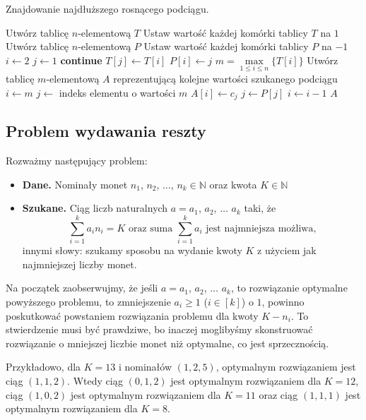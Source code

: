 \begin{algorithm}[H]
	\caption{Znajdowanie najdłuższego rosnącego podciągu.}\label{MaxIncreasingSubseqence}
	\begin{algorithmic}[1]
		\State Utwórz tablicę $n$-elementową $T$
		\State Ustaw wartość każdej komórki tablicy $T$ na $1$
		\State Utwórz tablicę $n$-elementową $P$
		\State Ustaw wartość każdej komórki tablicy $P$ na $-1$
		\State $i \gets 2$
		\State $j \gets 1$
		\textbf{continue}
		\EndIf
		\State $T[j] \gets T[i]$
		\State $P[i] \gets j$
		\EndIf
		\EndWhile
		\EndWhile
		\State $m = \max\limits_{1 \leq i \leq n}\{T[i]\}$ 
		\State Utwórz tablicę $m$-elementową $A$ reprezentującą
		kolejne wartości szukanego podciągu
		\State $i \gets m$
		\State $j \gets$ indeks elementu o wartości $m$
		\State $A[i] \gets c_j$
		\State $j \gets P[j]$
		\State $i \gets i - 1$
		\EndWhile
		\State \Return $A$
		\EndProcedure
	\end{algorithmic}
\end{algorithm}

\subsection{Problem wydawania reszty}
Rozważmy następujący problem:
\begin{itemize}
	\item[] \textbf{Dane.} Nominały monet $n_1$, $n_2$, 
	$\ldots$, $n_k \in \mathbb{N}$ oraz kwota $K \in \mathbb{N}$
	\item[] \textbf{Szukane.} Ciąg liczb naturalnych $a = a_1$, $a_2$,
	$\ldots$ $a_k$ taki, że 
	\[\sum\limits_{i=1}^{k} a_in_i = K \text{ oraz suma } 
	\sum\limits_{i=1}^{k} a_i
	\text{ jest najmniejsza możliwa,}\]
	innymi słowy: szukamy sposobu na wydanie kwoty $K$ z użyciem
	jak najmniejszej liczby monet.
\end{itemize}

Na początek zaobserwujmy, że jeśli $a = a_1$, $a_2$,
$\ldots$ $a_k$, to rozwiązanie optymalne powyższego problemu, to 
zmniejszenie $a_i \geq 1$ ($i \in [k]$) o $1$, powinno 
poskutkować powstaniem rozwiązania problemu dla kwoty $K - n_i$.
To stwierdzenie musi być prawdziwe, bo inaczej moglibyśmy
skonstruować rozwiązanie o mniejszej liczbie monet
niż optymalne, co jest sprzecznością.

Przykładowo, dla $K = 13$ i nominałów $(1, 2, 5)$, optymalnym
rozwiązaniem jest ciąg $(1, 1, 2)$. Wtedy ciąg $(0, 1, 2)$
jest optymalnym rozwiązaniem dla $K = 12$, ciąg 
$(1, 0, 2)$ jest optymalnym rozwiązaniem dla $K = 11$ oraz
ciąg $(1, 1, 1)$ jest optymalnym rozwiązaniem dla $K = 8$.

